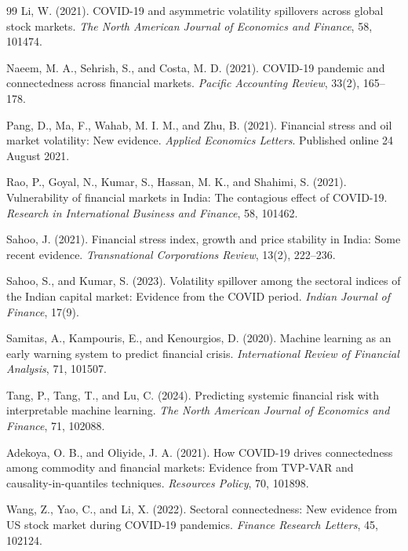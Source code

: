 \documentclass[12pt,a4paper]{article}
\begin{document}
\begin{thebibliography}{99}
Li, W. (2021). COVID-19 and asymmetric volatility spillovers across global stock markets. \textit{The North American Journal of Economics and Finance}, 58, 101474.

Naeem, M. A., Sehrish, S., and Costa, M. D. (2021). COVID-19 pandemic and connectedness across financial markets. \textit{Pacific Accounting Review}, 33(2), 165--178.

Pang, D., Ma, F., Wahab, M. I. M., and Zhu, B. (2021). Financial stress and oil market volatility: New evidence. \textit{Applied Economics Letters}. Published online 24 August 2021.

Rao, P., Goyal, N., Kumar, S., Hassan, M. K., and Shahimi, S. (2021). Vulnerability of financial markets in India: The contagious effect of COVID-19. \textit{Research in International Business and Finance}, 58, 101462.

Sahoo, J. (2021). Financial stress index, growth and price stability in India: Some recent evidence. \textit{Transnational Corporations Review}, 13(2), 222--236.

Sahoo, S., and Kumar, S. (2023). Volatility spillover among the sectoral indices of the Indian capital market: Evidence from the COVID period. \textit{Indian Journal of Finance}, 17(9).

Samitas, A., Kampouris, E., and Kenourgios, D. (2020). Machine learning as an early warning system to predict financial crisis. \textit{International Review of Financial Analysis}, 71, 101507.

Tang, P., Tang, T., and Lu, C. (2024). Predicting systemic financial risk with interpretable machine learning. \textit{The North American Journal of Economics and Finance}, 71, 102088.

Adekoya, O. B., and Oliyide, J. A. (2021). How COVID-19 drives connectedness among commodity and financial markets: Evidence from TVP-VAR and causality-in-quantiles techniques. \textit{Resources Policy}, 70, 101898.

Wang, Z., Yao, C., and Li, X. (2022). Sectoral connectedness: New evidence from US stock market during COVID-19 pandemics. \textit{Finance Research Letters}, 45, 102124.


\end{thebibliography}
\end{document}
